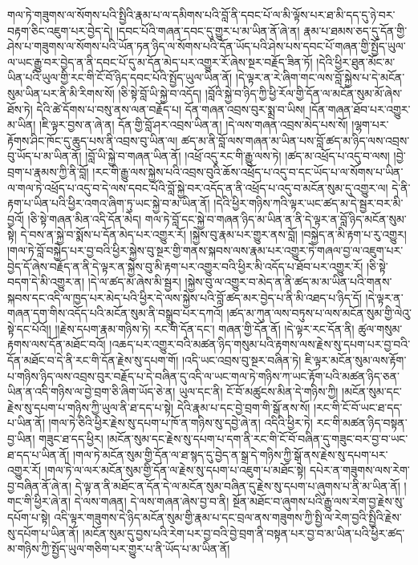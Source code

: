 གལ་ཏེ་གཟུགས་ལ་སོགས་པའི་སྤྱིའི་རྣམ་པ་ལ་དམིགས་པའི་བློ་ནི་དབང་པོ་ལ་མི་ལྟོས་པར་ཐ་མི་དད་དུ་ཉེ་བར་བརྟག་ཅིང་འཇུག་པར་བྱེད་དེ། །དབང་པོའི་གཞན་དབང་དུ་གྱུར་པ་མ་ཡིན་ནོ་ཞེ་ན། རྣམ་པ་ཐམས་ཅད་དུ་དོན་གྱི་ཤེས་པ་གཟུགས་ལ་སོགས་པའི་ཡོན་ཏན་ཉིད་ལ་སོགས་པའི་དོན་ཡོད་པའི་ཤེས་པས་དབང་པོ་གཞན་གྱི་སྤྱོད་ཡུལ་ལ་ཡང་རྒྱུ་བར་བྱེད་ན་ནི་དབང་པོ་དུ་མ་དོན་མེད་པར་འགྱུར་རོ་ཞེས་སྔར་བརྗོད་ཟིན་ཏོ། །དེའི་ཕྱིར་ཐུན་མོང་མ་ཡིན་པའི་ཡུལ་གྱི་རང་གི་ངོ་བོ་ཉིད་དབང་པོའི་སྤྱོད་ཡུལ་ཡིན་ནོ། །དེ་ལྟར་ན་རེ་ཞིག་གང་ལས་བློ་སྐྱེས་པ་དེ་མངོན་སུམ་ཡིན་པར་ནི་མི་རིགས་སོ། །ཅི་སྟེ་བློ་ཡི་སྐྱེ་བ་འདོད། །བློའི་སྐྱེ་བ་ཉིད་ཀྱི་ཕྱི་རོལ་གྱི་དོན་ལ་མངོན་སུམ་མོ་ཞེས་ཐོས་ཏེ། དེའི་ཚེ་དོགས་པ་བསུ་ནས་ལན་བརྗོད་པ། དོན་གཞན་འབྲས་བུར་སྨྲ་བ་ཡིས། །དོན་གཞན་ཐོབ་པར་འགྱུར་མ་ཡིན། །ཇི་ལྟར་བྱས་ན་ཞེ་ན། དོན་གྱི་བློ་ཤར་འབྲས་ཡིན་ན། །དེ་ལས་གཞན་འབྲས་མེད་པས་སོ། །ལྷག་པར་རྟོགས་ཤིང་ཁོང་དུ་ཆུད་པས་ནི་འབྲས་བུ་ཡིན་ལ། ཚད་མ་ནི་བློ་ལས་གཞན་མ་ཡིན་པས་བློ་ཚད་མ་ཉིད་ལས་འབྲས་བུ་ཡོད་པ་མ་ཡིན་ནོ། །བློ་ཡི་སྐྱེ་བ་གཞན་ཡིན་ནོ། །འཕྲོ་འདུ་རང་གི་རྒྱུ་ལས་ཏེ། །ཚད་མ་འཕྲོད་པ་འདུ་བ་ལས། །བྱེ་བྲག་པ་རྣམས་ཀྱི་ནི་བློ། །རང་གི་རྒྱུ་ལས་སྐྱེས་པའི་འབྲས་བུའི་ཆོས་འཕྲོད་པ་འདུ་བ་དང་ཡོད་པ་ལ་སོགས་པ་ཡིན་ལ་གལ་ཏེ་འཕྲོད་པ་འདུ་བ་དེ་ལས་དབང་པོའི་བློ་སྐྱེ་བར་འདོད་ན་ནི་འཕྲོད་པ་འདུ་བ་མངོན་སུམ་དུ་འགྱུར་ལ། དེ་ནི་རྟག་པ་ཡིན་པའི་ཕྱིར་འགའ་ཞིག་ཏུ་ཡང་སྐྱེ་བ་མ་ཡིན་ནོ། །དེའི་ཕྱིར་གཉིས་ཀའི་ལྟར་ཡང་ཚད་མ་དེ་སྦྱར་བར་མི་བྱའོ། །ཅི་སྟེ་གཞན་མིན་འདི་དོན་མེད། གལ་ཏེ་བློ་དང་སྐྱེ་བ་གཞན་ཉིད་མ་ཡིན་ན་ནི་དེ་ལྟར་ན་བློ་ཉིད་མངོན་སུམ་སྟེ། དེ་བས་ན་སྐྱེ་བ་སྨོས་པ་དོན་མེད་པར་འགྱུར་རོ། །སྐྱེས་བུ་རྣམ་པར་གྱུར་ནས་བློ། །བསྐྱེད་ན་མི་རྟག་པ་རུ་འགྱུར། །གལ་ཏེ་བློ་བསྐྱེད་པར་བྱ་བའི་ཕྱིར་སྐྱེས་བུ་སྔར་གྱི་གནས་སྐབས་ལས་རྣམ་པར་འགྱུར་ཏེ་གཞལ་བྱ་ལ་འཇུག་པར་བྱེད་དོ་ཞེས་བརྗོད་ན་ནི་དེ་ལྟར་ན་སྐྱེས་བུ་མི་རྟག་པར་འགྱུར་བའི་ཕྱིར་མི་འདོད་པ་ཐོབ་པར་འགྱུར་རོ། །ཅི་སྟེ་བདག་དེ་མི་འགྱུར་ན། །དེ་ལ་ཚད་མ་ཞེས་མི་སྦྱར། །སྐྱེས་བུ་ལ་འགྱུར་བ་མེད་ན་ནི་ཚད་མ་མ་ཡིན་པའི་གནས་སྐབས་དང་འདི་ལ་ཁྱད་པར་མེད་པའི་ཕྱིར་དེ་ལས་སྐྱེས་པའི་བློ་ཚད་མར་བྱེད་པ་ནི་མི་འཐད་པ་ཉིད་དོ། །དེ་ལྟར་ན་གཞན་དག་གིས་འདོད་པའི་མངོན་སུམ་ནི་བསྒྲུབ་པར་དཀའོ། །ཚད་མ་ཀུན་ལས་བཏུས་པ་ལས་མངོན་སུམ་གྱི་ལེའུ་སྟེ་དང་པོའོ།། །།རྗེས་དཔག་རྣམ་གཉིས་ཏེ། རང་གི་དོན་དང་། གཞན་གྱི་དོན་ནོ། །དེ་ལྟར་རང་དོན་ནི། ཚུལ་གསུམ་རྟགས་ལས་དོན་མཐོང་བའོ། །འཆད་པར་འགྱུར་བའི་མཚན་ཉིད་གསུམ་པའི་རྟགས་ལས་རྗེས་སུ་དཔག་པར་བྱ་བའི་དོན་མཐོང་བ་དེ་ནི་རང་གི་དོན་རྗེས་སུ་དཔག་གོ། །འདི་ཡང་འབྲས་བུ་སྔར་བཞིན་ཏེ། ཇི་ལྟར་མངོན་སུམ་ལས་རྟོག་པ་གཉིས་ཉིད་ལས་འབྲས་བུར་བརྗོད་པ་དེ་བཞིན་དུ་འདི་ལ་ཡང་གལ་ཏེ་གཉིས་ཀ་ཡང་རྟོག་པའི་མཚན་ཉིད་ཅན་ཡིན་ན་འདི་གཉིས་ལ་བྱེ་བྲག་ཅི་ཞིག་ཡོད་ཅེ་ན། ཡུལ་དང་ནི། ངོ་བོ་མཚུངས་མིན་དེ་གཉིས་ཀྱི། །མངོན་སུམ་དང་རྗེས་སུ་དཔག་པ་གཉིས་ཀྱི་ཡུལ་ནི་ཐ་དད་པ་སྟེ། དེའི་རྣམ་པ་དང་བྱེ་བྲག་གི་སྒོ་ནས་སོ། །རང་གི་ངོ་བོ་ཡང་ཐ་དད་པ་ཡིན་ནོ། །གལ་ཏེ་ཅིའི་ཕྱིར་རྗེས་སུ་དཔག་པ་ཁོ་ན་གཉིས་སུ་དབྱེ་ཞེ་ན། འདིའི་ཕྱིར་ཏེ། རང་གི་མཚན་ཉིད་བསྟན་བྱ་ཡིན། གཟུང་ཐ་དད་ཕྱིར། །མངོན་སུམ་དང་རྗེས་སུ་དཔག་པ་དག་ནི་རང་གི་ངོ་བོ་བཞིན་དུ་གཟུང་བར་བྱ་བ་ཡང་ཐ་དད་པ་ཡིན་ནོ། །གལ་ཏེ་མངོན་སུམ་གྱི་དོན་ལ་ཐ་སྙད་དུ་བྱེད་ན་སྒྲ་དེ་གཉིས་ཀྱི་སྒོ་ནས་རྗེས་སུ་དཔག་པར་འགྱུར་རོ། །གལ་ཏེ་ལ་ལར་མངོན་སུམ་གྱི་དོན་ལ་རྗེས་སུ་དཔག་པ་འཇུག་པ་མཐོང་སྟེ། དཔེར་ན་གཟུགས་ལས་རེག་བྱ་བཞིན་ནོ་ཞེ་ན། དེ་ལྟ་ན་ནི་མཐོང་ན་དོན་དེ་ལ་མངོན་སུམ་བཞིན་དུ་རྗེས་སུ་དཔག་པ་ཞུགས་པ་ནི་མ་ཡིན་ནོ། །གང་གི་ཕྱིར་ཞེ་ན། དེ་ལས་གཞན། དེ་ལས་གཞན་ཞེས་བྱ་བ་ནི། སྔོན་མཐོང་བ་ཞུགས་པའི་རྒྱུ་ལས་རེག་བྱ་རྗེས་སུ་དཔོག་པ་སྟེ། འདི་ལྟར་གཟུགས་དེ་ཉིད་མངོན་སུམ་གྱི་རྣམ་པ་དང་བྲལ་ནས་གཟུགས་ཀྱི་སྤྱི་ལ་རེག་བྱའི་སྤྱིའི་རྗེས་སུ་དཔོག་པ་ཡིན་ནོ། །མངོན་སུམ་དུ་བྱས་པའི་རེག་པར་བྱ་བའི་བྱེ་བྲག་ནི་བསྟན་པར་བྱ་བ་མ་ཡིན་པའི་ཕྱིར་ཚད་མ་གཉིས་ཀྱི་སྤྱོད་ཡུལ་གཅིག་པར་གྱུར་པ་ནི་ཡོད་པ་མ་ཡིན་ནོ། 